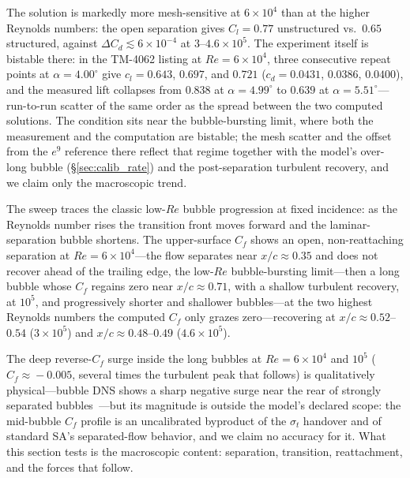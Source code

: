 \documentclass[journal]{new-aiaa}
\begin{document}
The solution is markedly more mesh-sensitive at $6\!\times\!10^4$ than at
the higher Reynolds numbers: the open separation gives
$C_l\!=\!0.77$ unstructured vs.\ $0.65$ structured, against
$\Delta C_d\!\lesssim\!6\!\times\!10^{-4}$ at $3$--$4.6\!\times\!10^5$.
The experiment itself is bistable there: in the TM-4062 listing at
$Re\!=\!6\!\times\!10^4$, three consecutive repeat points at
$\alpha\!=\!4.00^\circ$ give $c_l\!=\!0.643$, $0.697$, and $0.721$
($c_d\!=\!0.0431$, $0.0386$, $0.0400$), and the measured lift collapses from
$0.838$ at $\alpha\!=\!4.99^\circ$ to $0.639$ at
$\alpha\!=\!5.51^\circ$---run-to-run scatter of the same order as the spread
between the two computed solutions. The condition sits near the bubble-bursting limit, where both the measurement
and the computation are bistable; the mesh scatter and the offset from the
$e^9$ reference there reflect that regime together with the model's over-long
bubble (\S\ref{sec:calib_rate}) and the post-separation turbulent recovery, and
we claim only the macroscopic trend.

The sweep traces the classic low-$Re$ bubble progression at fixed incidence: as
the Reynolds number rises the transition front moves forward and the
laminar-separation bubble shortens. The upper-surface $C_f$ shows an open,
non-reattaching separation at $Re\!=\!6\!\times\!10^4$---the flow separates near
$x/c\!\approx\!0.35$ and does not recover ahead of the trailing edge, the
low-$Re$ bubble-bursting limit---then a long bubble whose $C_f$ regains zero
near $x/c\!\approx\!0.71$, with a
shallow turbulent recovery, at $10^5$, and progressively shorter and
shallower bubbles---at the two highest Reynolds numbers the computed $C_f$
only grazes zero---recovering at
$x/c\!\approx\!0.52$--$0.54$ ($3\!\times\!10^5$) and
$x/c\!\approx\!0.48$--$0.49$
($4.6\!\times\!10^5$).

The deep reverse-$C_f$ surge inside the long bubbles at
$Re\!=\!6\!\times\!10^4$ and $10^5$ ($C_f\!\approx\!-0.005$, several
times the turbulent peak that follows) is qualitatively physical---bubble
DNS shows a sharp negative surge near the rear of strongly separated
bubbles~\cite{spalart_strelets_2000, alam_sandham_2000}---but its
magnitude is outside the model's declared scope: the mid-bubble $C_f$
profile is an uncalibrated byproduct of the $\sigma_t$ handover and of
standard SA's separated-flow behavior, and we claim no accuracy for it.
What this section tests is the macroscopic content: separation,
transition, reattachment, and the forces that follow.
\end{document}
